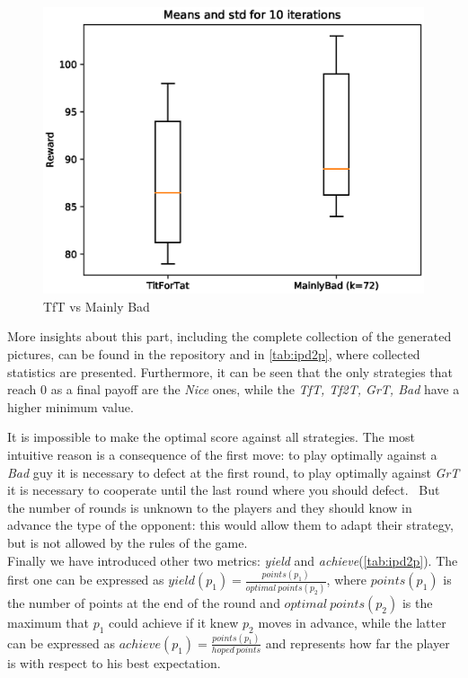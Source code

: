 \documentclass[journal,a4paper,10pt,twoside]{IEEEtran} %
\begin{document}
\begin{figure}[!ht]
    \centering
    \includegraphics[width=1\columnwidth]{../img/ipd2p/ipd2p-boxplot-TitForTat-MainlyBad(k=72)}
    \caption{TfT vs Mainly Bad}
    \label{fig:boxmbvtft}
\end{figure}

More insights about this part, including the complete collection of the generated pictures, can be found in the repository and in \autoref{tab:ipd2p}, where collected statistics are presented.
Furthermore, it can be seen that the only strategies that reach $0$ as a final payoff are the \textit{Nice} ones, while the \textit{TfT, Tf2T, GrT, Bad} have a higher minimum value.

It is impossible to make the optimal score against all strategies. The most intuitive reason is a consequence of the first move: to play optimally against a \textit{Bad} guy it is necessary to defect at the first round, to play optimally against \textit{GrT} it is necessary to cooperate until the last round where you should defect.~\cite{mathieu2017}
But the number of rounds is unknown to the players and they should know in advance the type of the opponent: this would allow them to adapt their strategy, but is not allowed by the rules of the game. 
\\
Finally we have introduced other two metrics: \textit{yield} and \textit{achieve}(\autoref{tab:ipd2p}). The first one can be expressed as $yield(p_1) = \frac{points(p_1)}{optimal\ points(p_2)}$, where $points(p_1)$ is the number of points at the end of the round and $optimal\ points(p_2)$ is the maximum that $p_1$ could achieve if it knew $p_2$ moves in advance, while the latter can be expressed as $achieve(p_1) = \frac{points(p_1)}{hoped\ points}$ and represents how far the player is with respect to his best expectation.
\end{document}
